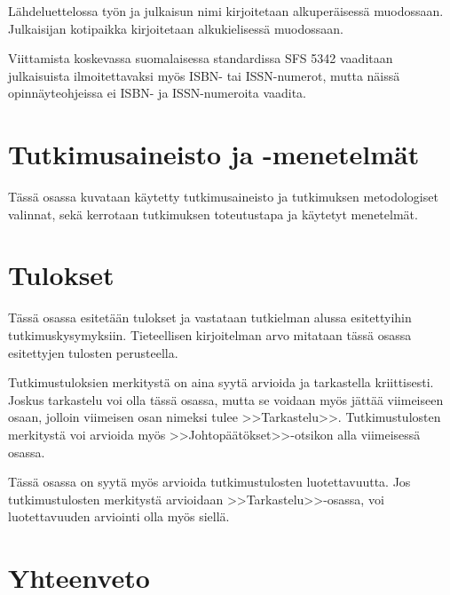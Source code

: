 \documentclass[english, 12pt, a4paper, sci, utf8, a-1b, online]{aaltothesis}
\begin{document}
Lähdeluettelossa työn ja julkaisun nimi kirjoitetaan alkuperäisessä
muodossaan. Julkaisijan kotipaikka kirjoitetaan alkukielisessä
muodossaan.

Viittamista koskevassa suomalaisessa standardissa
SFS 5342 \citep{sfs} vaaditaan julkaisuista ilmoitettavaksi myös ISBN- tai
ISSN-numerot, mutta näissä opinnäyteohjeissa ei ISBN- ja 
ISSN-numeroita vaadita. 


\section{Tutkimusaineisto ja -menetelmät}

Tässä osassa kuvataan käytetty tutkimusaineisto ja tutkimuksen metodologiset
valinnat, sekä kerrotaan tutkimuksen toteutustapa ja käytetyt menetelmät.


\section{Tulokset}

Tässä osassa esitetään tulokset ja vastataan tutkielman alussa
esitettyihin tutkimuskysymyksiin. Tieteellisen kirjoitelman
arvo mitataan tässä osassa esitettyjen tulosten perusteella. 

Tutkimustuloksien merkitystä on aina syytä arvioida ja tarkastella
kriittisesti.  Joskus tarkastelu voi olla tässä osassa, mutta se
voidaan myös jättää viimeiseen osaan, jolloin viimeisen osan nimeksi
tulee >>Tarkastelu>>. Tutkimustulosten merkitystä voi arvioida myös
>>Johtopäätökset>>-otsikon alla viimeisessä osassa. 

Tässä osassa on syytä myös arvioida tutkimustulosten luotettavuutta.
Jos tutkimustulosten merkitystä arvioidaan >>Tarkastelu>>-osassa,
voi luotettavuuden arviointi olla myös siellä. 


\section{Yhteenveto}
\end{document}
